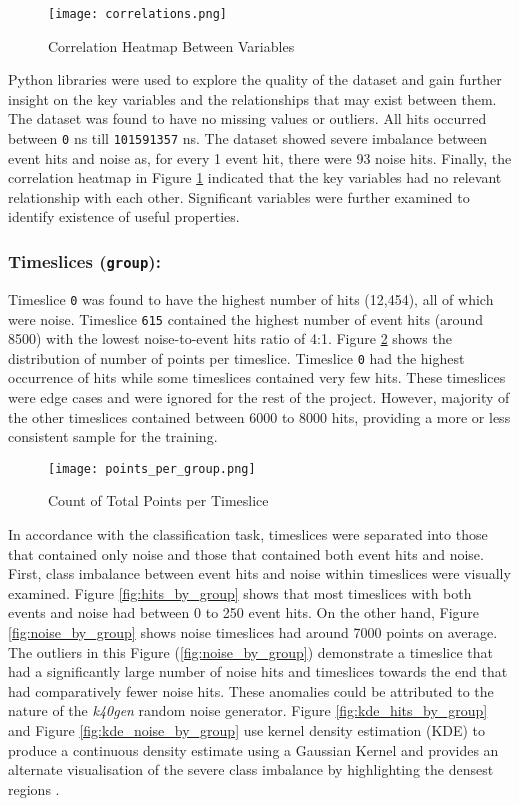 \begin{figure}[ht!]
    \centering
    \texttt{[image: correlations.png]}
    \caption{Correlation Heatmap Between Variables}
    \label{fig:corr}
\end{figure}

Python libraries were used to explore the quality of the dataset and gain further insight on the key variables and the relationships that may exist between them. The dataset was found to have no missing values or outliers. All hits occurred between \texttt{0} ns till \texttt{101591357} ns. The dataset showed severe imbalance between event hits and noise as, for every 1 event hit, there were 93 noise hits. Finally, the correlation heatmap in Figure \ref{fig:corr} indicated that the key variables had no relevant relationship with each other. Significant variables were further examined to identify existence of useful properties.


\subsubsection*{Timeslices (\texttt{group}):} 
Timeslice \texttt{0} was found to have the highest number of hits (12,454), all of which were noise. Timeslice \texttt{615} contained the highest number of event hits (around 8500) with the lowest noise-to-event hits ratio of 4:1. Figure \ref{fig:points_per_group} shows the distribution of number of points per timeslice. Timeslice \texttt{0} had the highest occurrence of hits while some timeslices contained very few hits. These timeslices were edge cases and were ignored for the rest of the project. However, majority of the other timeslices contained between 6000 to 8000 hits, providing a more or less consistent sample for the training.

\begin{figure}[ht!]
    \centering
    \texttt{[image: points\_per\_group.png]}
    \caption{Count of Total Points per Timeslice}
    \label{fig:points_per_group}
\end{figure}

In accordance with the classification task, timeslices were separated into those that contained only noise and those that contained both event hits and noise. First, class imbalance between event hits and noise within timeslices were visually examined. Figure \ref{fig:hits_by_group} shows that most timeslices with both events and noise had between 0 to 250 event hits. On the other hand, Figure \ref{fig:noise_by_group} shows noise timeslices had around 7000 points on average. The outliers in this Figure (\ref{fig:noise_by_group}) demonstrate a timeslice that had a significantly large number of noise hits and timeslices towards the end that had comparatively fewer noise hits. These anomalies could be attributed to the nature of the \textit{k40gen} random noise generator. Figure \ref{fig:kde_hits_by_group} and Figure \ref{fig:kde_noise_by_group} use kernel density estimation (KDE) to produce a continuous density estimate using a Gaussian Kernel and provides an alternate visualisation of the severe class imbalance by highlighting the densest regions \cite{waskom2020seaborn}.


